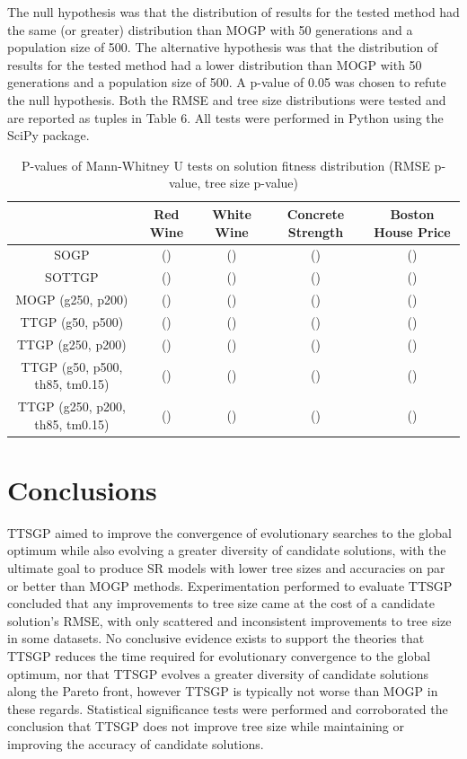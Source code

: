 \documentclass[a4paper, twocolumn]{article}
\begin{document}
The null hypothesis was that the distribution of results for the tested method had the same (or greater) distribution than MOGP with 50 generations and a population size of 500. The alternative hypothesis was that the distribution of results for the tested method had a lower distribution than MOGP with 50 generations and a population size of 500. A p-value of 0.05 was chosen to refute the null hypothesis. Both the RMSE and tree size distributions were tested and are reported as tuples in Table 6. All tests were performed in Python using the SciPy package.
\begin{table}[ht]
	\begin{center}
		\caption{P-values of Mann-Whitney U tests on solution fitness distribution (RMSE p-value, tree size p-value)}
		\label{table:1}
		\begin{tabular}{ c|cccc }
			& Red Wine & White Wine & Concrete Strength & Boston House Price\\
			\hline
			SOGP &()&()&()&()\\
			SOTTGP &()&()&()&()\\
			MOGP (g250, p200) &()&()&()&()\\
			TTGP (g50, p500) &()&()&()&()\\
			TTGP (g250, p200) &()&()&()&()\\
			TTGP (g50, p500, th85, tm0.15) &()&()&()&()\\
			TTGP (g250, p200, th85, tm0.15) &()&()&()&()\\
		\end{tabular}
	\end{center}
\end{table}

\section{Conclusions}
TTSGP aimed to improve the convergence of evolutionary searches to the global optimum while also evolving a greater diversity of candidate solutions, with the ultimate goal to produce SR models with lower tree sizes and accuracies on par or better than MOGP methods. Experimentation performed to evaluate TTSGP concluded that any improvements to tree size came at the cost of a candidate solution's RMSE, with only scattered and inconsistent improvements to tree size in some datasets. No conclusive evidence exists to support the theories that TTSGP reduces the time required for evolutionary convergence to the global optimum, nor that TTSGP evolves a greater diversity of candidate solutions along the Pareto front, however TTSGP is typically not worse than MOGP in these regards. Statistical significance tests were performed and corroborated the conclusion that TTSGP does not improve tree size while maintaining or improving the accuracy of candidate solutions.
\end{document}
